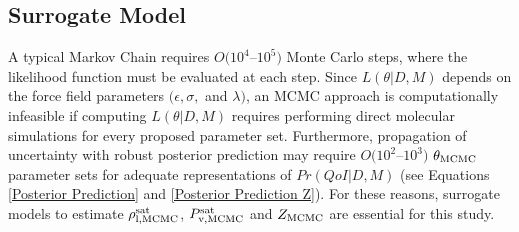 \documentclass[preprint,letterpaper,floatfix,citeautoscript,aip,jcp]{revtex4-1}
\begin{document}

\subsection{Surrogate Model} \label{Surrogate Model}

A typical Markov Chain requires $O(10^4$--$10^5)$ Monte Carlo steps, where the likelihood function must be evaluated at each step. Since $L(\theta|D,M)$ depends on the force field parameters $(\epsilon, \sigma, $ and $\lambda)$, an MCMC approach is computationally infeasible if computing $L(\theta|D,M)$ requires performing direct molecular simulations for every proposed parameter set. Furthermore, propagation of uncertainty with robust posterior prediction may require $O(10^2$--$10^3)$ $\theta_{\rm MCMC}$ parameter sets for adequate representations of $Pr(QoI|D,M)$ (see Equations \ref{Posterior Prediction} and \ref{Posterior Prediction Z}). For these reasons, surrogate models to estimate $\rho_{\rm l, MCMC}^{\rm sat}$, $P_{\rm v, MCMC}^{\rm sat}$ and $Z_{\rm MCMC}$ are essential for this study.
\end{document}
